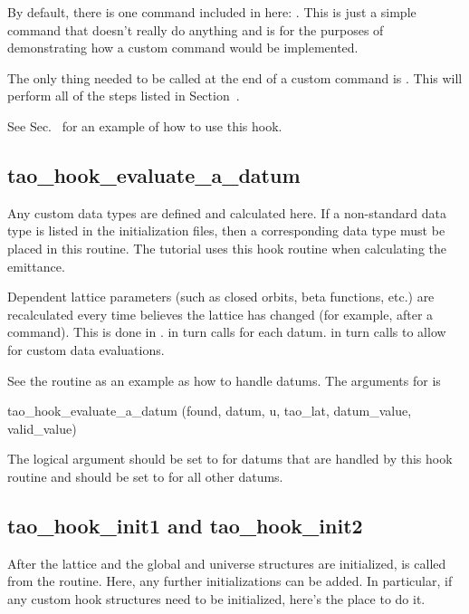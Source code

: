 {By default, there is one command included in here: . This is just a simple command that
doesn't really do anything and is for the purposes of demonstrating how a custom command would be
implemented.

The only thing needed to be called at the end of a custom command is . This
will perform all of the steps listed in Section~.

See Sec.~ for an example of how to use this hook.

\subsection{tao_hook_evaluate_a_datum}

Any custom data types are defined and calculated here. If a non-standard data type is listed in the
initialization files, then a corresponding data type must be placed in this routine. The tutorial
uses this hook routine when calculating the emittance.

Dependent lattice parameters (such as closed orbits, beta functions, etc.) are recalculated every
time \tao believes the lattice has changed (for example, after a  command).  This is done
in .  in turn calls  for each
datum.  in turn calls  to allow for custom
data evaluations. 

See the  routine as an example as how to handle datums.  The arguments for
 is
\begin{example}
  tao_hook_evaluate_a_datum (found, datum, u, tao_lat, datum_value, valid_value)
\end{example}
The  logical argument should be set to  for datums that are handled by this hook
routine and  should be set to  for all other datums.

\subsection{tao_hook_init1 and tao_hook_init2}
\label{s:hook.init}

After the  lattice and the global and universe structures are initialized,
 is called from the  routine. Here, any further initializations can
be added. In particular, if any custom hook structures need to be initialized, here's the place to
do it.

}
